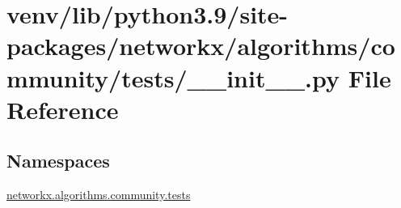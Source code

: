 \hypertarget{venv_2lib_2python3_89_2site-packages_2networkx_2algorithms_2community_2tests_2____init_____8py}{}\section{venv/lib/python3.9/site-\/packages/networkx/algorithms/community/tests/\+\_\+\+\_\+init\+\_\+\+\_\+.py File Reference}
\label{venv_2lib_2python3_89_2site-packages_2networkx_2algorithms_2community_2tests_2____init_____8py}
\subsection*{Namespaces}
\begin{DoxyCompactItemize}
\item 
 \hyperlink{namespacenetworkx_1_1algorithms_1_1community_1_1tests}{networkx.\+algorithms.\+community.\+tests}
\end{DoxyCompactItemize}
